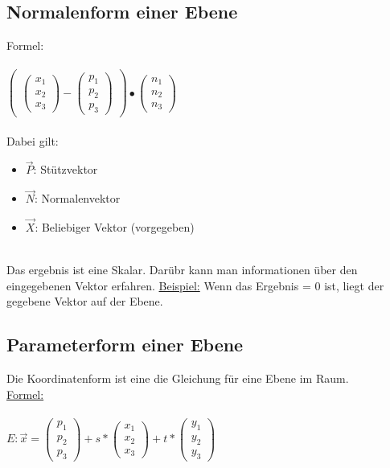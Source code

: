 \subsection{Normalenform einer Ebene}
Formel: \\\\
$
\begin{pmatrix}
    \begin{pmatrix}
        x_1 \\ x_2 \\ x_3
    \end{pmatrix}
    -
    \begin{pmatrix}
        p_1 \\ p_2 \\ p_3
    \end{pmatrix}
\end{pmatrix}
\bullet
\begin{pmatrix}
    n_1 \\ n_2 \\ n_3
\end{pmatrix}
$
\\\\
Dabei gilt:
\begin{itemize}
    \item $\vec{P}$: Stützvektor
    \item $\vec{N}$: Normalenvektor
    \item $\vec{X}$: Beliebiger Vektor (vorgegeben)
\end{itemize}
\ \\
Das ergebnis ist eine Skalar.
Darübr kann man informationen über den eingegebenen Vektor erfahren. 
\underline{Beispiel:} Wenn das Ergebnis = 0 ist, liegt der gegebene Vektor auf der Ebene.

\subsection{Parameterform einer Ebene}
Die Koordinatenform ist eine die Gleichung für eine Ebene im Raum. \\
\underline{Formel:} \\\\
$
E: \vec{x} =
\begin{pmatrix}
    p_1 \\ p_2 \\ p_3
\end{pmatrix}
+ s * 
\begin{pmatrix}
    x_1 \\ x_2 \\ x_3
\end{pmatrix}
+ t * 
\begin{pmatrix}
    y_1 \\ y_2 \\ y_3
\end{pmatrix}
$


